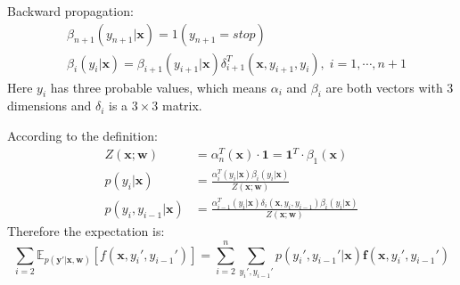 \documentclass[12pt]{article}
\begin{document}
Backward propagation:
\begin{align*}
&\beta_{n+1}(y_{n+1}|\bm{x})=
1(y_{n+1} = stop)\\
&\beta_i(y_i|\bm{x})=\beta_{i+1}(y_{i+1}|\bm{x})\delta_{i+1}^T(\bm{x},y_{i+1},y_i),\;i=1,\cdots,n+1
\end{align*}
Here $y_i$ has three probable values, which means $\alpha_i$ and $\beta_i$ are both vectors with 3 dimensions and $\delta_i$ is a $3\times3$ matrix.
\par 
According to the definition:
\begin{align*}
Z(\bm{x};\bm{w})&=\alpha_n^T(\bm x)\cdot\bm 1=\bm 1^T\cdot\beta_1(\bm x)\\
p(y_i|\bm x)&=\frac{\alpha_i^T(y_i|\bm x)\beta_i(y_i|\bm x)}{Z(\bm x;\bm w)}\\
p(y_i,y_{i-1}|\bm x)&=\frac{\alpha_{i-1}^T(y_i|\bm x)\delta_i(\bm{x},y_i,y_{i-1})\beta_i(y_i|\bm x)}{Z(\bm x;\bm w)}
\end{align*}
Therefore the expectation is:
$$\sum_{i=2}\mathbb{E}_{p(\bm y'|\bm x,\bm w)}[f(\bm x,y_i',y_{i-1}')]=\sum_{i=2}^n\sum_{y_i',y_{i-1}'}p(y_i',y_{i-1}'|\bm x)\bm f(\bm x,y_i',y_{i-1}')$$
\end{document}
